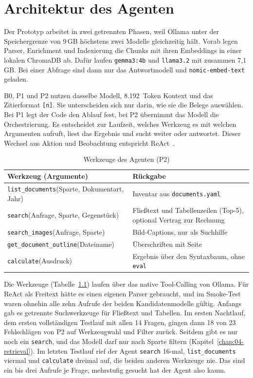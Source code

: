 
\chapter{Architektur des Agenten}
\label{chap:03-architecture}


Der Prototyp arbeitet in zwei getrennten Phasen, weil Ollama unter der Speichergrenze von 9\,GB höchstens zwei Modelle gleichzeitig hält. Vorab legen Parser, Enrichment und Indexierung die Chunks mit ihren Embeddings in einer lokalen ChromaDB ab. Dafür laufen \texttt{gemma3:4b} und \texttt{llama3.2} mit zusammen 7,1\,GB. Bei einer Abfrage sind dann nur das Antwortmodell und \texttt{nomic-embed-text} geladen.

B0, P1 und P2 nutzen dasselbe Modell, 8.192~Token Kontext und das Zitierformat \texttt{[n]}. Sie unterscheiden sich nur darin, wie sie die Belege auswählen. Bei P1 legt der Code den Ablauf fest, bei P2 übernimmt das Modell die Orchestrierung. Es entscheidet zur Laufzeit, welches Werkzeug es mit welchen Argumenten aufruft, liest das Ergebnis und sucht weiter oder antwortet. Dieser Wechsel aus Aktion und Beobachtung entspricht ReAct~\cite{yao2023react}.

\begin{table}[htbp]
\centering
\small
\renewcommand{\arraystretch}{1.15}
\begin{tabularx}{\textwidth}{@{}l X@{}}
\hline
Werkzeug (Argumente) & Rückgabe \\
\hline
\texttt{list\_documents}(Sparte, Dokumentart, Jahr) & Inventar aus \texttt{documents.yaml} \\
\texttt{search}(Anfrage, Sparte, Gegenstück) & Fließtext und Tabellenzeilen (Top-5), optional Vertrag zur Rechnung \\
\texttt{search\_images}(Anfrage, Sparte) & Bild-Captions, nur als Suchhilfe \\
\texttt{get\_document\_outline}(Dateiname) & Überschriften mit Seite \\
\texttt{calculate}(Ausdruck) & Ergebnis über den Syntaxbaum, ohne \texttt{eval} \\
\hline
\end{tabularx}
\caption{Werkzeuge des Agenten (P2)}
\label{tab:tools}
\end{table}

Die Werkzeuge (Tabelle~\ref{tab:tools}) laufen über das native Tool-Calling von Ollama. Für ReAct als Freitext hätte es einen eigenen Parser gebraucht, und im Smoke-Test waren ohnehin alle zehn Aufrufe der beiden Kandidatenmodelle gültig. Anfangs gab es getrennte Suchwerkzeuge für Fließtext und Tabellen. Im ersten Nachtlauf, dem ersten vollständigen Testlauf mit allen 14 Fragen, gingen dann 18 von 23 Fehlschlägen von P2 auf Werkzeugwahl und Filter zurück. Seitdem gibt es nur noch ein \texttt{search}, und das Modell darf nur nach Sparte filtern (Kapitel~\ref{chap:04-retrieval}). Im letzten Testlauf rief der Agent \texttt{search} 16-mal, \texttt{list\_documents} viermal und \texttt{calculate} dreimal auf, die beiden anderen Werkzeuge nie. Das sind ein bis drei Aufrufe je Frage, mehrstufig gesucht hat der Agent also kaum.

